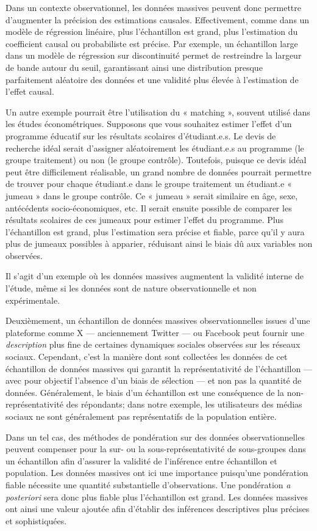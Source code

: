 \documentclass[
  letterpaper,
]{scrbook}
\begin{document}
Dans un contexte observationnel, les données massives peuvent donc
permettre d'augmenter la précision des estimations causales.
Effectivement, comme dans un modèle de régression linéaire, plus
l'échantillon est grand, plus l'estimation du coefficient causal ou
probabiliste est précise. Par exemple, un échantillon large dans un
modèle de régression sur discontinuité permet de restreindre la largeur
de bande autour du seuil, garantissant ainsi une distribution presque
parfaitement aléatoire des données et une validité plus élevée à
l'estimation de l'effet causal.

Un autre exemple pourrait être l'utilisation du « matching », souvent
utilisé dans les études économétriques. Supposons que vous souhaitez
estimer l'effet d'un programme éducatif sur les résultats scolaires
d'étudiant.e.s. Le devis de recherche idéal serait d'assigner
aléatoirement les étudiant.e.s au programme (le groupe traitement) ou
non (le groupe contrôle). Toutefois, puisque ce devis idéal peut être
difficilement réalisable, un grand nombre de données pourrait permettre
de trouver pour chaque étudiant.e dans le groupe traitement un
étudiant.e « jumeau » dans le groupe contrôle. Ce « jumeau » serait
similaire en âge, sexe, antécédents socio-économiques, etc. Il serait
ensuite possible de comparer les résultats scolaires de ces jumeaux pour
estimer l'effet du programme. Plus l'échantillon est grand, plus
l'estimation sera précise et fiable, parce qu'il y aura plus de jumeaux
possibles à apparier, réduisant ainsi le biais dû aux variables non
observées.

Il s'agit d'un exemple où les données massives augmentent la validité
interne de l'étude, même si les données sont de nature observationnelle
et non expérimentale.

Deuxièmement, un échantillon de données massives observationnelles
issues d'une plateforme comme X --- anciennement Twitter --- ou Facebook
peut fournir une \emph{description} plus fine de certaines dynamiques
sociales observées sur les réseaux sociaux. Cependant, c'est la manière
dont sont collectées les données de cet échantillon de données massives
qui garantit la représentativité de l'échantillon --- avec pour objectif
l'absence d'un biais de sélection --- et non pas la quantité de données.
Généralement, le biais d'un échantillon est une conséquence de la
non-représentativité des répondants; dans notre exemple, les
utilisateurs des médias sociaux ne sont généralement pas représentatifs
de la population entière.

Dans un tel cas, des méthodes de pondération sur des données
observationnelles peuvent compenser pour la sur- ou la
sous-représentativité de sous-groupes dans un échantillon afin d'assurer
la validité de l'inférence entre échantillon et population. Les données
massives ont ici une importance puisqu'une pondération fiable nécessite
une quantité substantielle d'observations. Une pondération \emph{a
posteriori} sera donc plus fiable plus l'échantillon est grand. Les
données massives ont ainsi une valeur ajoutée afin d'établir des
inférences descriptives plus précises et sophistiquées.
\end{document}
